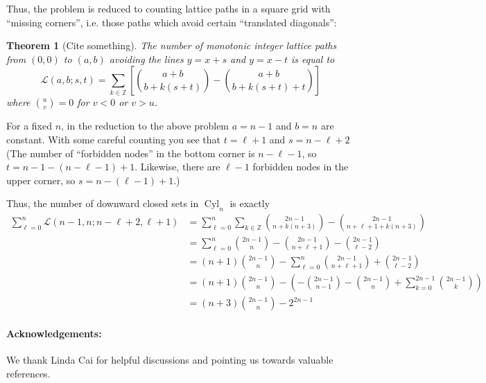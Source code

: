 \documentclass[12pt]{article}
\newtheorem{theorem}{Theorem}
\newcommand{\Z}{\mathbb{Z}}
\DeclareMathOperator{\Cyl}{Cyl}
\newcommand{\1}[1]{\mathds{1}[{#1}]}
\begin{document}
Thus, the problem is reduced to counting lattice paths in a square grid with
``missing corners'', i.e. those paths which avoid certain ``translated
diagonals'':

\begin{theorem}[Cite something]
  The number of monotonic integer lattice paths from $(0,0)$ to $(a,b)$ avoiding
  the lines $y=x+s$ and $y=x-t$ is equal to
  \[ \mathscr L(a,b;s,t) = \sum_{k\in\Z} \left[ {a+b \choose b + k(s+t)} 
      - {a+b \choose b + k(s+t) + t} \right]
    \]
  where ${u \choose v }= 0$ for $v<0$ or $v>u$.
\end{theorem}

For a fixed $n$, in the reduction to the above problem $a=n-1$ and $b=n$ are
constant. With some careful counting you see that $t=\ell+1$ and $s=n-\ell+2$
(The number of ``forbidden nodes'' in the bottom corner is $n-\ell-1$,
so $t= n-1 - (n-\ell-1) + 1$. Likewise, there are $\ell-1$ forbidden nodes in
the upper corner, so $s = n - (\ell-1) + 1$.)

Thus, the number of downward closed sets in $\Cyl_n$ is exactly
\begin{align*}
  \sum_{\ell=0}^n \mathscr L(n-1,n;n-\ell+2,\ell+1)
  & = \sum_{\ell=0}^n \sum_{k\in\Z} {2n-1 \choose n + k(n+3)} 
      - {2n-1 \choose n +\ell+1 +k(n+3)} \\
  & = \sum_{\ell=0}^n {2n-1 \choose n } 
      - {2n-1 \choose n +\ell+1 } - {2n-1 \choose \ell -2} \\
  & = (n+1){2n-1 \choose n } 
       - \sum_{\ell=0}^n {2n-1 \choose n +\ell+1 } + {2n-1 \choose \ell -2} \\
  & = (n+1){2n-1 \choose n } 
       - \left( -{2n-1 \choose n-1} - {2n-1 \choose n} +
       \sum_{k=0}^{2n-1} {2n-1 \choose k} \right) \\
  & = (n+3){2n-1 \choose n } - 2^{2n-1}
  \end{align*}

\paragraph{Acknowledgements:}
We thank Linda Cai for helpful discussions and pointing us towards valuable 
references.
\end{document}
